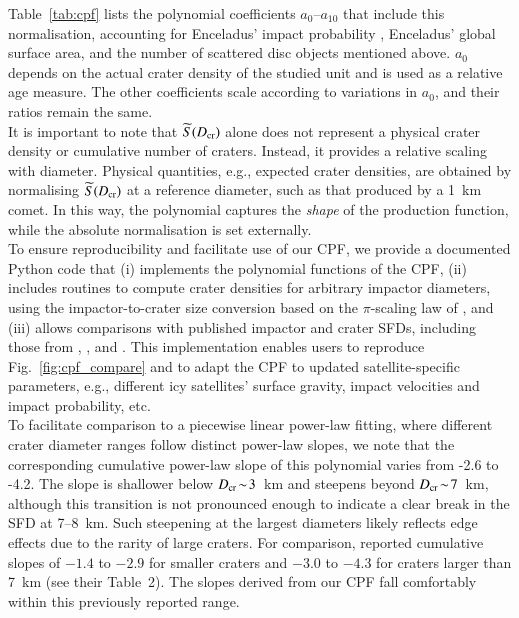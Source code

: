 \documentclass[preprint,11pt,3p,times,authoryear]{elsarticle}
\begin{document}
Table~\ref{tab:cpf} lists the polynomial coefficients $a_{0}$–$a_{10}$ that include this normalisation, accounting for Enceladus’ impact probability \citep{Wong2023,Brasser2025}, Enceladus' global surface area, and the number of scattered disc objects mentioned above. $a_{0}$ depends on the actual crater density of the studied unit and is used as a relative age measure. The other coefficients scale according to variations in $a_0$, and their ratios remain the same.\\

It is important to note that $\widetilde{S}(D_{\rm cr})$ alone does not represent a physical crater density or cumulative number of craters. Instead, it provides a relative scaling with diameter.
Physical quantities, e.g., expected crater densities, are obtained by normalising $\widetilde{S}(D_{\rm cr})$ at a reference diameter, such as that produced by a 1~km comet.
In this way, the polynomial captures the \emph{shape} of the production function, while the absolute normalisation is set externally.\\

To ensure reproducibility and facilitate use of our CPF, we provide a documented Python code that (i) implements the polynomial functions of the CPF, (ii) includes routines to compute crater densities for arbitrary impactor diameters, using the impactor-to-crater size conversion based on the $\pi$-scaling law of \citet{Zahnle2003}, and (iii) allows comparisons with published impactor and crater SFDs, including those from \citet{Kirchoff2009}, \citet{Zahnle2003}, and \citet{Singer2019}. 
This implementation enables users to reproduce Fig.~\ref{fig:cpf_compare} and to adapt the CPF to updated satellite-specific parameters, e.g., different icy satellites' surface gravity, impact velocities and impact probability, etc.\\

To facilitate comparison to a piecewise linear power-law fitting, where different crater diameter ranges follow distinct power-law slopes, we note that the corresponding cumulative power-law slope of this polynomial varies from -2.6 to -4.2.
The slope is shallower below $D_{\rm cr}\!\sim\!3$~km and steepens beyond $D_{\rm cr}\!\sim\!7$~km, although this transition is not pronounced enough to indicate a clear break in the SFD at 7--8~km. Such steepening at the largest diameters likely reflects edge effects due to the rarity of large craters.
For comparison, \citet{Kirchoff2009} reported cumulative slopes of $-1.4$ to $-2.9$
for smaller craters and $-3.0$ to $-4.3$ for craters larger than 7~km (see their Table~2). The slopes derived from our CPF fall comfortably within this previously reported range.\\
\end{document}
